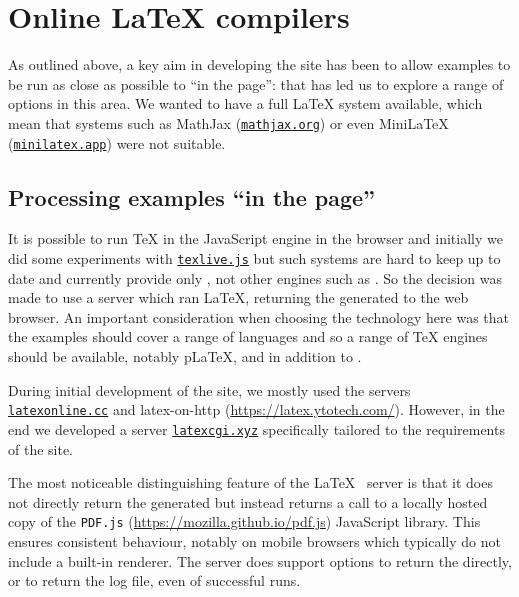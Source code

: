 \documentclass[final]{ltugboat}
\begin{document}
\section{Online \LaTeX{} compilers}

As outlined above, a key aim in developing the site has been to allow examples
to be run as close as possible to \enquote{in the page}: that has led us to
explore a range of options in this area. We wanted to have a full \LaTeX{}
system available, which mean that systems such as MathJax (\href{https://mathjax.org}{\nolinkurl{mathjax.org}})
or even Mini\LaTeX{} (\href{https://minilatex.app}{\nolinkurl{minilatex.app}}) were not suitable.

\subsection{Processing examples \enquote{in the page}}

It is possible to run \TeX{} in the JavaScript engine in the browser and
initially we did some experiments with
\href{https://github.com/manuels/texlive.js/}{\texttt{texlive.js}} but
such systems are hard to keep up to date and currently provide only
, not other engines such as . So the decision was
made to use a server which ran \LaTeX{}, returning the generated 
to the web browser.  An important consideration when choosing the
technology here was that the examples should cover a range of
languages and so a range of \TeX{} engines should be available,
notably p\LaTeX{},  and  in addition to
.

During initial development of the site, we mostly used the servers
\href{https://latexonline.cc}{\texttt{latexonline.cc}}
and
{latex-on-http} (\url{https://latex.ytotech.com/}). However, in
the end we developed a server
\href{https://latexcgi.xyz}{\nolinkurl{latexcgi.xyz}}
specifically tailored to the
requirements of the site.

The most noticeable distinguishing feature of the \LaTeX{}~ server
is that it does not directly return the generated  but instead
returns a
call to a locally hosted copy of the
\texttt{PDF.js} (\url{https://mozilla.github.io/pdf.js})
JavaScript library. This ensures consistent behaviour, notably on
mobile browsers which typically do not include a built-in 
renderer.
The server does support options to return the  directly, or to return
the log file, even of successful runs.
\end{document}
